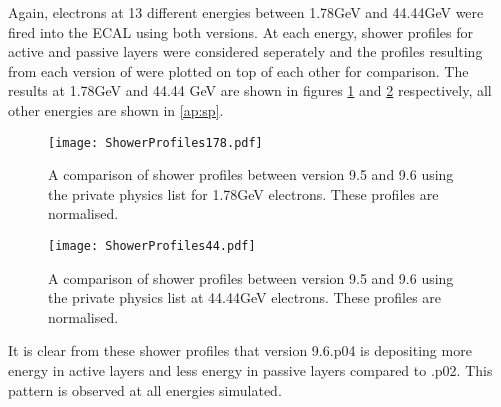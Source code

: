 Again, electrons at 13 different energies between 1.78GeV and 44.44GeV were fired into the ECAL using both \geant versions.  At each energy, shower profiles for active and passive layers were considered seperately and the profiles resulting from each version of \geant were plotted on top of each other for comparison.  The results at 1.78GeV and 44.44 GeV are shown in figures \ref{fig:1.78sp} and \ref{fig:44.44sp} respectively, all other energies are shown in \ref{ap:sp}.
\begin{figure}[h]
  \centering
  \texttt{[image: ShowerProfiles178.pdf]}
  \caption{A comparison of shower profiles between \geant version 9.5 and 9.6 using the \lhcb private physics list for 1.78GeV electrons.  These profiles are normalised.}
    \label{fig:1.78sp}
\end{figure}
\begin{figure}[h]
  \centering
  \texttt{[image: ShowerProfiles44.pdf]}
  \caption{A comparison of shower profiles between \geant version 9.5 and 9.6 using the \lhcb private physics list at 44.44GeV electrons. These profiles are normalised.}
    \label{fig:44.44sp}
\end{figure}

It is clear from these shower profiles that \geant version 9.6.p04 is depositing more energy in active layers and less energy in passive layers compared to .p02.  This pattern is observed at all energies simulated.


